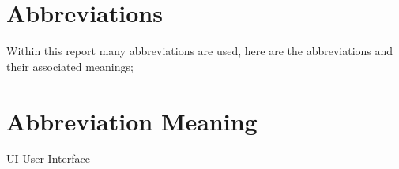 \section{Abbreviations}\label{abbreviations}

Within this report many abbreviations are used, here are the
abbreviations and their associated meanings;

\section{\textbar{} Abbreviation \textbar{} Meaning
\textbar{}}\label{abbreviation-meaning}

UI \textbar{} User Interface \textbar{}
